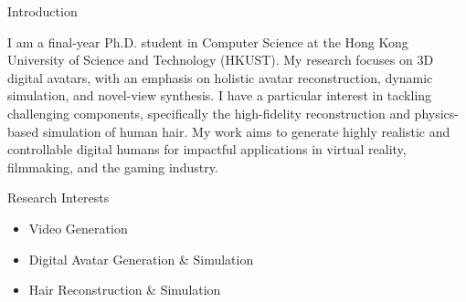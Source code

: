 \documentclass{resume} %
\begin{document}
\begin{rSection}{Introduction}
\begin{itemize}[leftmargin=10pt]
\setlength{\itemsep}{-5pt}
I am a final-year Ph.D. student in Computer Science at the Hong Kong University of Science and Technology (HKUST). My research focuses on 3D digital avatars, with an emphasis on holistic avatar reconstruction, dynamic simulation, and novel-view synthesis. I have a particular interest in tackling challenging components, specifically the high-fidelity reconstruction and physics-based simulation of human hair. My work aims to generate highly realistic and controllable digital humans for impactful applications in virtual reality, filmmaking, and the gaming industry.
\end{itemize}
\end{rSection}

\begin{rSection}{Research Interests}
\begin{itemize}[leftmargin=18pt]
\setlength{\itemsep}{-5pt}
    \item Video Generation
    \item Digital Avatar Generation \& Simulation
    \item Hair Reconstruction \& Simulation
\end{itemize}
\end{rSection}
\end{document}
